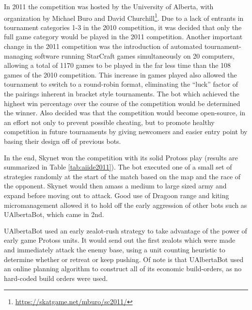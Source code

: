\documentclass[journal]{IEEEtran}
\begin{document}
In 2011 the competition was hosted by the University of Alberta, with organization by Michael Buro and
David Churchill\footnote{\url{https://skatgame.net/mburo/sc2011/}}. Due to a lack of entrants in tournament categories 1-3 in the 2010 competition, it was
decided that only the full game category would be played in the 2011 competition. Another important
change in the 2011 competition was the introduction of automated tournament-managing software running
StarCraft games simultaneously on 20 computers, allowing a total of 1170 games to be played in the far less
time than the 108 games of the 2010 competition. This increase in games played also allowed the tournament
to switch to a round-robin format, eliminating the ``luck'' factor of the pairings inherent in bracket
style tournaments. The bot which achieved the highest win percentage over the course of the competition would
be determined the winner. Also decided was that the competition would become open-source, in an effort not
only to prevent possible cheating, but to promote healthy competition in future tournaments by giving
newcomers and easier entry point by basing their design off of previous bots.

In the  end, Skynet  won the competition  with its solid  Protoss play
(results  are  summarized   in  Table  \ref{tab:aiide2011}).  The  bot
executed one of a small set of strategies randomly at the start of the
match based on the map and the race of the opponent. Skynet would then
amass a  medium to large  sized army and  expand before moving  out to
attack. Good  use of Dragoon range and  kiting micromanagement allowed
it to hold off the early aggression of other bots such as UAlbertaBot,
which came in 2nd.

UAlbertaBot used an early zealot-rush strategy to take advantage of the power of early game Protoss units. 
It would send out the first zealots which were made and immediately attack the enemy base, using a unit
counting heuristic to determine whether or retreat or keep pushing. Of note is that UAlbertaBot used an
online planning algorithm to construct all of its economic build-orders\cite{churchill2011build}, as no hard-coded build orders
were used. 
\end{document}
